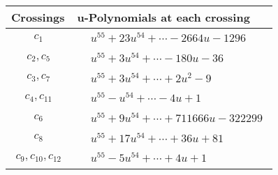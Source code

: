 \documentclass[1p]{elsarticle_modified}
\theoremstyle{definition}
\begin{document}
\begin{tabular}{m{50pt}|m{274pt}}
Crossings & \hspace{64pt}u-Polynomials at each crossing \\
\hline $$\begin{aligned}c_{1}\end{aligned}$$&$\begin{aligned}
&u^{55}+23 u^{54}+\cdots-2664 u-1296
\end{aligned}$\\
\hline $$\begin{aligned}c_{2},c_{5}\end{aligned}$$&$\begin{aligned}
&u^{55}+3 u^{54}+\cdots-180 u-36
\end{aligned}$\\
\hline $$\begin{aligned}c_{3},c_{7}\end{aligned}$$&$\begin{aligned}
&u^{55}+3 u^{54}+\cdots+2 u^2-9
\end{aligned}$\\
\hline $$\begin{aligned}c_{4},c_{11}\end{aligned}$$&$\begin{aligned}
&u^{55}- u^{54}+\cdots-4 u+1
\end{aligned}$\\
\hline $$\begin{aligned}c_{6}\end{aligned}$$&$\begin{aligned}
&u^{55}+9 u^{54}+\cdots+711666 u-322299
\end{aligned}$\\
\hline $$\begin{aligned}c_{8}\end{aligned}$$&$\begin{aligned}
&u^{55}+17 u^{54}+\cdots+36 u+81
\end{aligned}$\\
\hline $$\begin{aligned}c_{9},c_{10},c_{12}\end{aligned}$$&$\begin{aligned}
&u^{55}-5 u^{54}+\cdots+4 u+1
\end{aligned}$\\
\hline
\end{tabular}\\~\\
\newpage\renewcommand{\arraystretch}{1}
\end{document}
